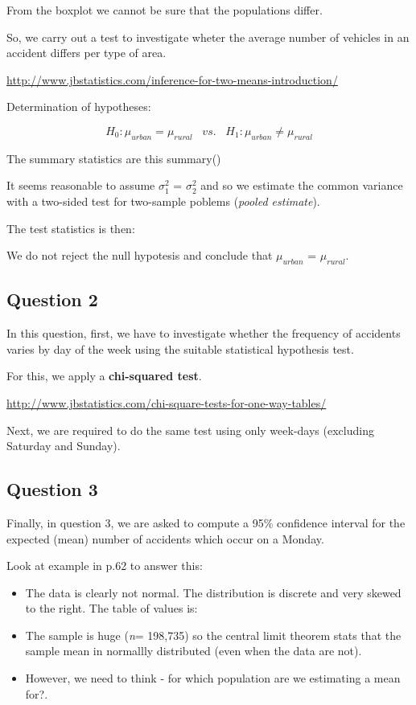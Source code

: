 \documentclass[]{article}
\begin{document}
From the boxplot we cannot be sure that the populations differ.

So, we carry out a test to investigate wheter the average number of
vehicles in an accident differs per type of area.

\url{http://www.jbstatistics.com/inference-for-two-means-introduction/}

Determination of hypotheses:

\[H_{0}: \mu_{urban} = \mu_{rural}\;\;\;vs.\;\;\;H_{1}: \mu_{urban} \neq \mu_{rural}\]

The summary statistics are this summary()

It seems reasonable to assume \(\sigma_{1}^{2}\) = \(\sigma_{2}^{2}\)
and so we estimate the common variance with a two-sided test for
two-sample poblems (\emph{pooled estimate}).

The test statistics is then:

We do not reject the null hypotesis and conclude that \(\mu_{urban}\) =
\(\mu_{rural}\).

\subsection{Question 2}\label{question-2}

In this question, first, we have to investigate whether the frequency of
accidents varies by day of the week using the suitable statistical
hypothesis test.

For this, we apply a \textbf{chi-squared test}.

\url{http://www.jbstatistics.com/chi-square-tests-for-one-way-tables/}

Next, we are required to do the same test using only week-days
(excluding Saturday and Sunday).

\subsection{Question 3}\label{question-3}

Finally, in question 3, we are asked to compute a 95\% confidence
interval for the expected (mean) number of accidents which occur on a
Monday.

Look at example in p.62 to answer this:

\begin{itemize}
\item
  The data is clearly not normal. The distribution is discrete and very
  skewed to the right. The table of values is:
\item
  The sample is huge (\emph{n}= 198,735) so the central limit theorem
  stats that the sample mean in normallly distributed (even when the
  data are not).
\item
  However, we need to think - for which population are we estimating a
  mean for?.
\end{itemize}
\end{document}
